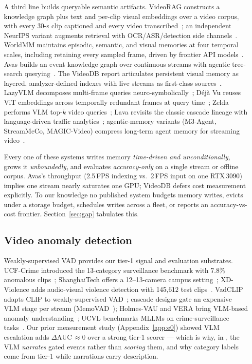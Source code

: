 A third line builds queryable semantic artifacts. VideoRAG constructs a knowledge graph plus text and per-clip visual embeddings over a video corpus, with every 30-s clip captioned and every video transcribed~\cite{videoraghkuds}; an independent NeurIPS variant augments retrieval with OCR/ASR/detection side channels~\cite{videoragneurips}. WorldMM maintains episodic, semantic, and visual memories at four temporal scales, including retaining every sampled frame, driven by frontier API models~\cite{worldmm}. Avas builds an event knowledge graph over continuous streams with agentic tree-search querying~\cite{avas}. The VideoDB report articulates persistent visual memory as layered, analyzer-defined indexes with live streams as first-class sources~\cite{videodb}. LazyVLM decomposes multi-frame queries neuro-symbolically~\cite{lazyvlm}; D\'ej\`a Vu reuses ViT embeddings across temporally redundant frames at query time~\cite{dejavu}; Zelda performs VLM top-$k$ video queries~\cite{zelda}; Lava revisits the classic cascade lineage with language-driven traffic analytics~\cite{lava}; agentic-memory variants (M3-Agent, StreamMeCo, MAGIC-Video) compress long-term agent memory for streaming video~\cite{m3agent,streammeco,magicvideo}.

Every one of these systems writes memory \emph{time-driven and unconditionally}, grows it \emph{unboundedly}, and evaluates \emph{accuracy-only} on a single stream or offline corpus. Avas's throughput (2.5\,FPS indexing vs.\ 2\,FPS input on one RTX\,3090) implies one stream nearly saturates one GPU; VideoDB defers cost measurement explicitly. To our knowledge no published system budgets memory writes, evicts under a storage budget, schedules writes across a fleet, or reports an accuracy-vs-cost frontier. Section~\ref{sec:gap} tabulates this.

\subsection{Video anomaly detection}
\label{sec:related-vad}

Weakly-supervised VAD provides our tier-1 signal and evaluation substrates. UCF-Crime introduced the 13-category surveillance benchmark with 7.8\% anomalous clips~\cite{ucfcrime}; ShanghaiTech offers a 12--13-camera campus setting~\cite{shanghaitech}; XD-Violence adds audio-visual violence detection with 145{,}612 test clips~\cite{xdviolence}. VadCLIP adapts CLIP to weakly-supervised VAD~\cite{vadclip}; cascade designs gate an expensive VLM stage per stream (MemoVAD~\cite{memovad}); Holmes-VAU and VERA bring VLM-based anomaly understanding~\cite{holmesvau,vera}; UCVL benchmarks MLLMs on crime-surveillance tasks~\cite{ucvl}. Our prior measurement study (Appendix~\ref{app:e0}) showed VLM escalation adds $\Delta$AUC\,$\approx 0$ over a strong tier-1 scorer --- which is why, in \sys, the VLM \emph{narrates} gated events rather than \emph{scoring} them, and why category labels come from tier-1 while narrations carry description.

